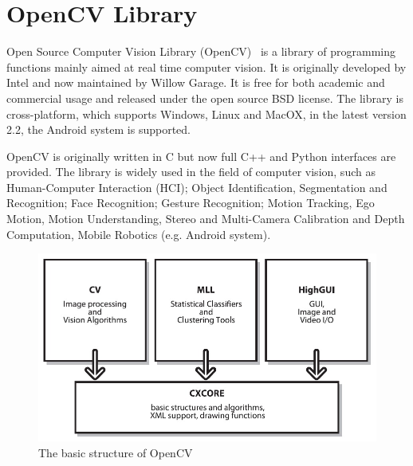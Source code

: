 \section{OpenCV Library}
\label{sec:opencv}

Open Source Computer Vision Library (OpenCV)~\cite{opencv} is a library of
programming functions mainly aimed at real time computer vision. It is
originally developed by Intel and now maintained by Willow Garage. It
is free for both academic and commercial usage and released  under the
open source BSD license. The library is cross-platform, which supports
Windows, Linux and MacOX,  in the latest version 2.2, the Android
system is supported.

OpenCV is originally written in C but now full C++ and Python
interfaces are provided. The library is widely used in the field of
computer vision, such as Human-Computer Interaction (HCI); Object
Identification, Segmentation and Recognition; Face Recognition;
Gesture Recognition; Motion Tracking, Ego Motion, Motion
Understanding, Stereo and Multi-Camera
Calibration and Depth Computation, Mobile Robotics (e.g. Android
system).

\begin{figure}[htbp]
  \centering
\includegraphics[width=\linewidth]{images/bsopencv.jpg}
  \caption{The basic structure of OpenCV~\cite{bradski2008learning}}
  \label{fig:bsopencv}
\end{figure}


